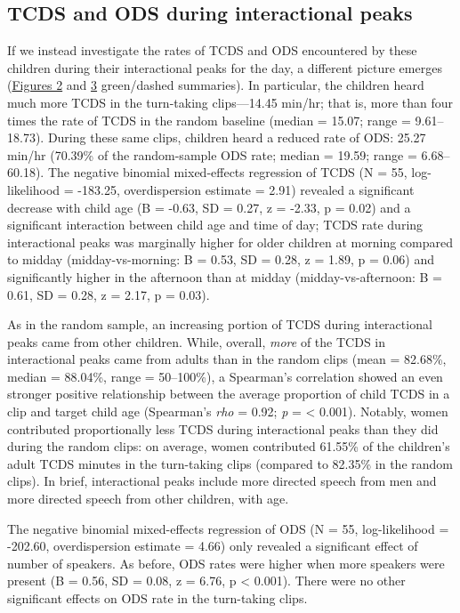\documentclass[,man,floatsintext]{apa6}
\begin{document}
\subsection{TCDS and ODS during interactional
peaks}\label{tcds-and-ods-during-interactional-peaks}

If we instead investigate the rates of TCDS and ODS encountered by these
children during their interactional peaks for the day, a different
picture emerges (\protect\hyperlink{fig2}{Figures 2} and
\protect\hyperlink{fig3}{3} green/dashed summaries). In particular, the
children heard much more TCDS in the turn-taking clips---14.45 min/hr;
that is, more than four times the rate of TCDS in the random baseline
(median = 15.07; range = 9.61--18.73). During these same clips, children
heard a reduced rate of ODS: 25.27 min/hr (70.39\% of the random-sample
ODS rate; median = 19.59; range = 6.68--60.18). The negative binomial
mixed-effects regression of TCDS (N = 55, log-likelihood = -183.25,
overdispersion estimate = 2.91) revealed a significant decrease with
child age (B = -0.63, SD = 0.27, z = -2.33, p = 0.02) and a significant
interaction between child age and time of day; TCDS rate during
interactional peaks was marginally higher for older children at morning
compared to midday (midday-vs-morning: B = 0.53, SD = 0.28, z = 1.89, p
= 0.06) and significantly higher in the afternoon than at midday
(midday-vs-afternoon: B = 0.61, SD = 0.28, z = 2.17, p = 0.03).

As in the random sample, an increasing portion of TCDS during
interactional peaks came from other children. While, overall,
\emph{more} of the TCDS in interactional peaks came from adults than in
the random clips (mean = 82.68\%, median = 88.04\%, range = 50--100\%),
a Spearman's correlation showed an even stronger positive relationship
between the average proportion of child TCDS in a clip and target child
age (Spearman's \emph{rho} = 0.92; \emph{p} = \textless{} 0.001).
Notably, women contributed proportionally less TCDS during interactional
peaks than they did during the random clips: on average, women
contributed 61.55\% of the children's adult TCDS minutes in the
turn-taking clips (compared to 82.35\% in the random clips). In brief,
interactional peaks include more directed speech from men and more
directed speech from other children, with age.

The negative binomial mixed-effects regression of ODS (N = 55,
log-likelihood = -202.60, overdispersion estimate = 4.66) only revealed
a significant effect of number of speakers. As before, ODS rates were
higher when more speakers were present (B = 0.56, SD = 0.08, z = 6.76, p
\textless{} 0.001). There were no other significant effects on ODS rate
in the turn-taking clips.
\end{document}
